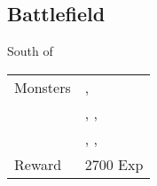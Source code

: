 \subsection{Battlefield}
\label{map:battlefield_20}

South of 

\noindent\begin{tabularx}{\textwidth}[l]{lX}
	Monsters
	& \nameref{monster:water_hag}, \nameref{monster:water_hag} \\
	& \nameref{monster:water_hag}, \nameref{monster:water_hag}, \nameref{monster:vampire} \\
	& \nameref{monster:water_hag}, \nameref{monster:water_hag}, \nameref{monster:water_hag}
\\ \hline
	Reward & 2700 Exp
\end{tabularx}
